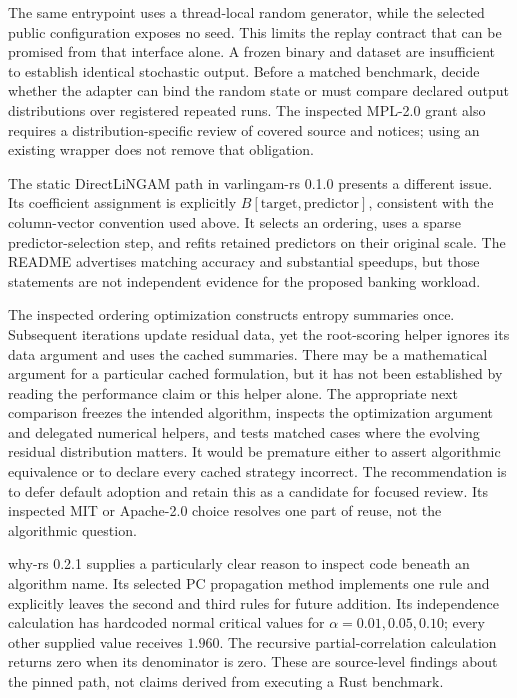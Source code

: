 The same entrypoint uses a thread-local random generator, while the selected
public configuration exposes no seed. This limits the replay contract that
can be promised from that interface alone. A frozen binary and dataset are
insufficient to establish identical stochastic output. Before a matched
benchmark, decide whether the adapter can bind the random state or must
compare declared output distributions over registered repeated runs. The
inspected MPL-2.0 grant also requires a distribution-specific review of
covered source and notices; using an existing wrapper does not remove that
obligation.

The static DirectLiNGAM path in varlingam-rs 0.1.0 presents a different issue.
Its coefficient assignment is explicitly $B[\mathrm{target},\mathrm{predictor}]$,
consistent with the column-vector convention used above. It selects an
ordering, uses a sparse predictor-selection step, and refits retained
predictors on their original scale. The README advertises matching accuracy
and substantial speedups, but those statements are not independent evidence
for the proposed banking workload\citep{exec13_other_varlingam}.

The inspected ordering optimization constructs entropy summaries once.
Subsequent iterations update residual data, yet the root-scoring helper
ignores its data argument and uses the cached summaries. There may be a
mathematical argument for a particular cached formulation, but it has not
been established by reading the performance claim or this helper alone.
The appropriate next comparison freezes the intended algorithm, inspects
the optimization argument and delegated numerical helpers, and tests
matched cases where the evolving residual distribution matters. It would be
premature either to assert algorithmic equivalence or to declare every
cached strategy incorrect. The recommendation is to defer default adoption
and retain this as a candidate for focused review. Its inspected MIT or
Apache-2.0 choice resolves one part of reuse, not the algorithmic question.

why-rs 0.2.1 supplies a particularly clear reason to inspect code beneath an
algorithm name. Its selected PC propagation method implements one rule and
explicitly leaves the second and third rules for future addition. Its
independence calculation has hardcoded normal critical values for
$\alpha=0.01,0.05,0.10$; every other supplied value receives $1.960$.
The recursive partial-correlation calculation returns zero when its
denominator is zero. These are source-level findings about the pinned path,
not claims derived from executing a Rust benchmark\citep{exec13_other_why}.

